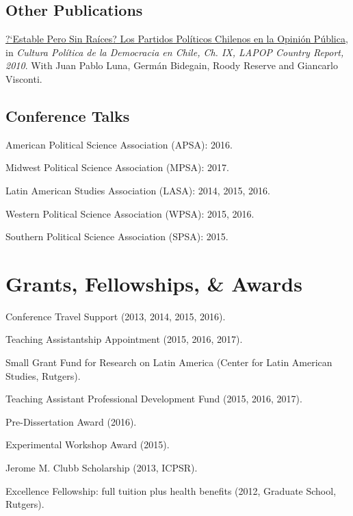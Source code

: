 \documentclass[letterpaper]{article}
\renewenvironment{itemize}{
  \begin{list}{}{
    \setlength{\leftmargin}{1.5em}
  }
}{
  \end{list}
}
\begin{document}
\subsection*{Other Publications}

\begin{itemize}
\item[$\bullet$] \href{http://www.vanderbilt.edu/lapop/chile/Chile-2010-cultura-politica.pdf}{?`Estable Pero Sin Ra\'ices? Los Partidos Pol\'iticos Chilenos en la Opini\'on P\'ublica}, in \emph{Cultura Pol\'itica de la Democracia en Chile, Ch. IX, LAPOP Country Report, 2010}. With Juan Pablo Luna, Germ\'an Bidegain, Roody Reserve and Giancarlo Visconti.
\end{itemize}

\subsection*{Conference Talks}

\begin{itemize}
\item American Political Science Association (APSA): 2016.
\item Midwest Political Science Association (MPSA): 2017.
\item Latin American Studies Association (LASA): 2014, 2015, 2016.
\item Western Political Science Association (WPSA): 2015, 2016.
\item Southern Political Science Association (SPSA): 2015.
\end{itemize}


\section*{Grants, Fellowships, \& Awards}

\begin{itemize}
\item Conference Travel Support (2013, 2014, 2015, 2016).
\item Teaching Assistantship Appointment (2015, 2016, 2017).
\item Small Grant Fund for Research on Latin America (Center for Latin American Studies, Rutgers).
\item Teaching Assistant Professional Development Fund (2015, 2016, 2017).
\item Pre-Dissertation Award (2016).
\item Experimental Workshop Award (2015).
\item Jerome M. Clubb Scholarship (2013, ICPSR).
\item Excellence Fellowship: full tuition plus health benefits (2012, Graduate School, Rutgers).
\end{itemize}
\end{document}
